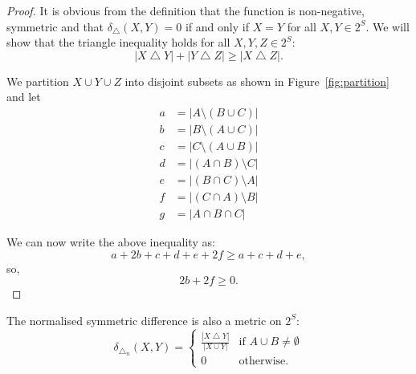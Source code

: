 \documentclass[a4paper]{report}
\DeclareMathOperator{\symdif}{\bigtriangleup}
\begin{document}
\begin{proof}
  It is obvious from the definition that the function is non-negative,
  symmetric and that $\delta_{\symdif}(X,Y)=0$ if and only if $X=Y$ for all
  $X,Y \in 2^{S}$.  We will show that the triangle inequality holds for all
  $X,Y,Z \in 2^{S}$:
  \begin{equation*}
    |X \symdif Y| + |Y \symdif Z| \geq |X \symdif Z|.
  \end{equation*}

  We partition $X \cup Y \cup Z$ into disjoint subsets as shown in
  Figure~\ref{fig:partition} and let
  \begin{align*}
    a &= |A \setminus (B \cup C)|\\
    b &= |B \setminus (A \cup C)|\\
    c &= |C \setminus (A \cup B)|\\
    d &= |(A \cap B) \setminus C|\\
    e &= |(B \cap C) \setminus A|\\
    f &= |(C \cap A) \setminus B|\\
    g &= |A \cap B \cap C|
  \end{align*}

  We can now write the above inequality as:
  \begin{equation*}
    a+2b+c+d+e+2f \geq a+c+d+e,
  \end{equation*}
  so,
  \begin{equation*}
    2b+2f \geq 0.
  \end{equation*}
\end{proof}

The normalised symmetric difference is also a metric on $2^{S}$:
\begin{equation*}
  \delta_{\symdif_n}(X,Y) =
  \begin{cases}
    \displaystyle \frac{|X \symdif Y|}{|X \cup Y|} & \text{if $A \cup B \neq
      \emptyset$} \\
    0 & \text{otherwise.}
  \end{cases}
\end{equation*}
\end{document}
